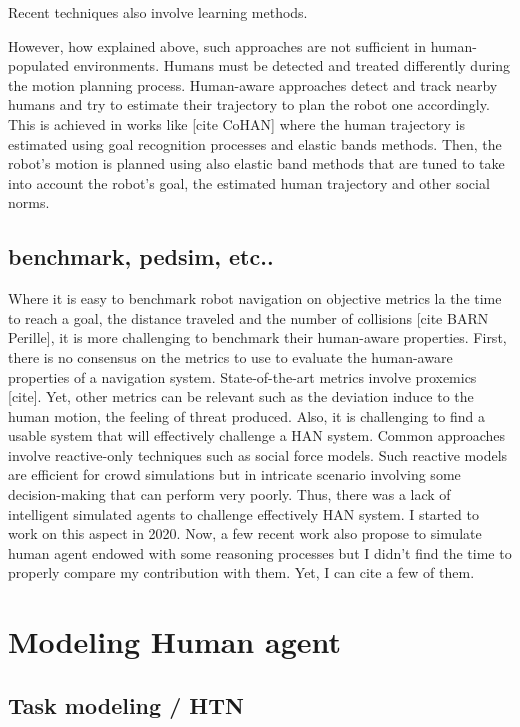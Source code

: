 Recent techniques also involve learning methods.

However, how explained above, such approaches are not sufficient in human-populated environments. Humans must be detected and treated differently during the motion planning process. Human-aware approaches detect and track nearby humans and try to estimate their trajectory to plan the robot one accordingly. This is achieved in works like [cite CoHAN] where the human trajectory is estimated using goal recognition processes and elastic bands methods. Then, the robot's motion is planned using also elastic band methods that are tuned to take into account the robot's goal, the estimated human trajectory and other social norms.   

\subsection{benchmark, pedsim, etc..}

Where it is easy to benchmark robot navigation on objective metrics la the time to reach a goal, the distance traveled and the number of collisions [cite BARN Perille], it is more challenging to benchmark their human-aware properties.
First, there is no consensus on the metrics to use to evaluate the human-aware properties of a navigation system. State-of-the-art metrics involve proxemics [cite]. Yet, other metrics can be relevant such as the deviation induce to the human motion, the feeling of threat produced.
Also, it is challenging to find a usable system that will effectively challenge a HAN system. 
Common approaches involve reactive-only techniques such as social force models. Such reactive models are efficient for crowd simulations but in intricate scenario involving some decision-making that can perform very poorly. Thus, there was a lack of intelligent simulated agents to challenge effectively HAN system.
I started to work on this aspect in 2020. Now, a few recent work also propose to simulate human agent endowed with some reasoning processes but I didn't find the time to properly compare my contribution with them. Yet, I can cite a few of them. 


\section{Modeling Human agent}

\subsection{Task modeling / HTN}

